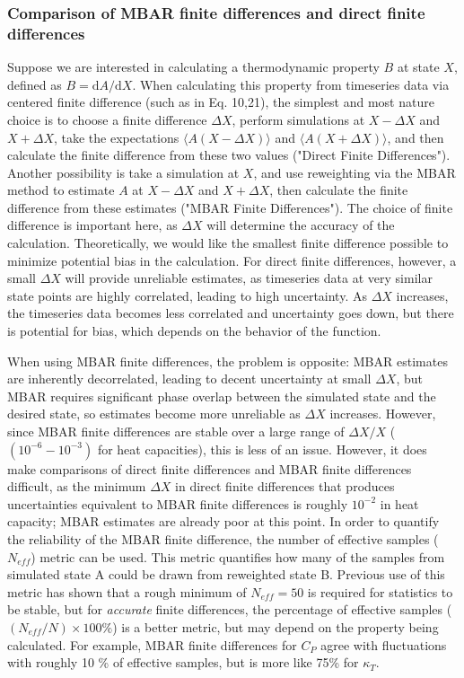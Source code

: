 \documentclass[9pt,bestpractices]{livecoms}
\begin{document}
\subsubsection{Comparison of MBAR finite differences and direct finite differences}
Suppose we are interested in calculating a thermodynamic property $B$ at state $X$, defined as $B=\mathrm{d}A/\mathrm{d}X$.
When calculating this property from timeseries data via centered finite difference (such as in Eq. 10,21), the simplest and most nature choice is to choose a finite difference $\Delta X$, perform simulations at $X-\Delta X$ and $X+\Delta X$, take the expectations $\langle A(X-\Delta X) \rangle$ and $\langle A(X+\Delta X)\rangle $, and then calculate the finite difference from these two values ("Direct Finite Differences").
  Another possibility is take a simulation at $X$, and use reweighting via the MBAR method \cite{MBAR} to estimate $A$ at $X-\Delta X$ and $X+\Delta X$, then calculate the finite difference from these estimates ("MBAR Finite Differences").  
The choice of finite difference is important here, as $\Delta X$ will determine the accuracy of the calculation. Theoretically, we would like the smallest finite difference possible to minimize potential bias in the calculation.  For direct finite differences, however, a small $\Delta X $ will provide unreliable estimates, as timeseries data at very similar state points are highly correlated, leading to high uncertainty.  As $ \Delta X $ increases, the timeseries data becomes less correlated and uncertainty goes down, but there is potential for bias, which depends on the behavior of the function.

When using MBAR finite differences, the problem is opposite: MBAR estimates are inherently decorrelated, leading to decent uncertainty at small $\Delta X$, but MBAR requires significant phase overlap between the simulated state and the desired state, so estimates become more unreliable as $\Delta X$ increases. However, since MBAR finite differences are stable over a large range of $\Delta X/X$ ($(10^{-6}-10^{-3})$ for heat capacities), this is less of an issue. However, it does make comparisons of direct finite differences and MBAR finite differences difficult, as the minimum $\Delta X$ in direct finite differences that produces uncertainties equivalent to MBAR finite differences is roughly $10^{-2}$ in heat capacity; MBAR estimates are already poor at this point.  In order to quantify the reliability of the MBAR finite difference, the number of effective samples ($N_{eff}$) metric can be used.  This metric quantifies how many of the samples from simulated state A could be drawn from reweighted state B.  Previous use of this metric has shown that a rough minimum of $N_{eff}=50$ is required for statistics to be stable, but for \emph{accurate} finite differences, the percentage of effective samples ($(N_{eff}/N)\times 100 \% $) is a better metric, but may depend on the property being calculated.  For example, MBAR finite differences for $C_P$ agree with fluctuations with roughly 10 \% of effective samples, but is more like 75\% for $\kappa_T$.
\end{document}
